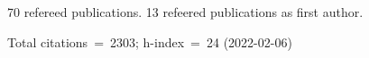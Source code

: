 70 refereed publications. 13 refeered publications as first author.

Total citations~=~2303; h-index~=~24 (2022-02-06)